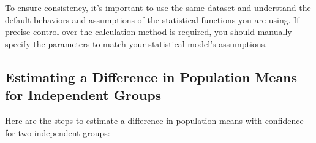 \documentclass[
  letterpaper,
  DIV=11,
  numbers=noendperiod]{scrartcl}
\begin{document}
To ensure consistency, it's important to use the same dataset and
understand the default behaviors and assumptions of the statistical
functions you are using. If precise control over the calculation method
is required, you should manually specify the parameters to match your
statistical model's assumptions.

\hypertarget{estimating-a-difference-in-population-means-for-independent-groups}{%
\subsection{Estimating a Difference in Population Means for Independent
Groups}\label{estimating-a-difference-in-population-means-for-independent-groups}}

Here are the steps to estimate a difference in population means with
confidence for two independent groups:
\end{document}
